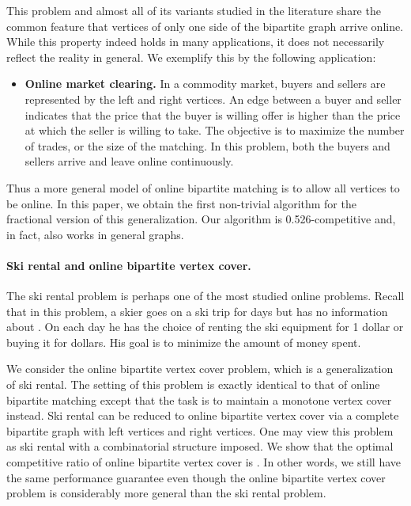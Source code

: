 \documentclass{article}
\begin{document}
This problem and almost all of its variants studied in the literature share the common feature that vertices of only one side of the bipartite graph arrive online. While this property indeed holds in many applications, it does not necessarily reflect the reality in general. We exemplify this by the following application:
\begin{itemize}

\item {\bf Online market clearing.} In a commodity market, buyers and sellers are represented by the left and right vertices. An edge between a buyer and seller indicates that the price that the buyer is willing offer is higher than the price at which the seller is willing to take. The objective is to maximize the number of trades, or the size of the matching. In this problem, both the buyers and sellers arrive and leave online continuously.

\end{itemize}
Thus a more general model of online bipartite matching is to allow all vertices to be online. In this paper, we obtain the first non-trivial algorithm for the fractional version of this generalization. Our algorithm is 0.526-competitive and, in fact, also works in general graphs.

\paragraph{Ski rental and online bipartite vertex cover.}
The ski rental problem is perhaps one of the most studied online problems. Recall that in this problem, a skier goes on a ski trip for  days but has no information about . On each day he has the choice of renting the ski equipment for 1 dollar or buying it for  dollars. His goal is to minimize the amount of money spent.

We consider the online bipartite vertex cover problem, which is a generalization of ski rental. The setting of this problem is exactly identical to that of online bipartite matching except that the task is to maintain a monotone vertex cover instead. Ski rental can be reduced to online bipartite vertex cover via a complete bipartite graph with  left vertices and  right vertices. One may view this problem as ski rental with a combinatorial structure imposed.
We show that the optimal competitive ratio of online bipartite vertex cover is . In other words, we still have the same performance guarantee even though the online bipartite vertex cover problem is considerably more general than the ski rental problem.
\end{document}
